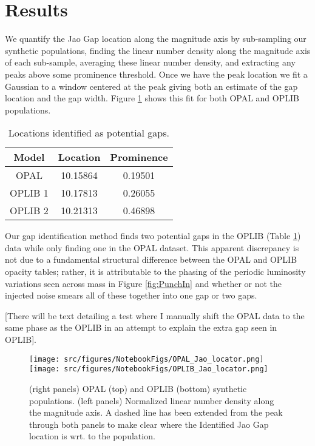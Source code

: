 \section{Results}\label{sec:results}
We quantify the Jao Gap location along the magnitude axis by sub-sampling
our synthetic populations, finding the linear number density along the
magnitude axis of each sub-sample, averaging these linear number density, and
extracting any peaks above some prominence threshold. Once we have the peak
location we fit a Gaussian to a window centered at the peak giving both an
estimate of the gap location and the gap width. Figure \ref{fig:JaoGapLocator}
shows this fit for both OPAL and OPLIB populations.

\begin{table}
	\centering
	\begin{tabular}{c | c c}
		\hline
		Model & Location & Prominence \\
		\hline
		\hline
		OPAL & 10.15864 & 0.19501 \\
		OPLIB 1 & 10.17813 & 0.26055 \\
		OPLIB 2 & 10.21313 & 0.46898
	\end{tabular}
	\caption{Locations identified as potential gaps.}
	\label{tab:GapLocation}
\end{table}

Our gap identification method finds two potential gaps in the OPLIB (Table
\ref{tab:GapLocation}) data while only finding one in the OPAL dataset. This
apparent discrepancy is not due to a fundamental structural difference between
the OPAL and OPLIB opacity tables; rather, it is attributable to the
phasing of the periodic luminosity variations seen across mass in Figure
\ref{fig:PunchIn} and whether or not the
injected noise smears all of these together into one gap or two gaps.

{\color{red} [There will be text detailing a test where I manually shift the
OPAL data to the same phase as the OPLIB in an attempt to explain the extra gap
seen in OPLIB]}.

\begin{figure}
	\centering
	\texttt{[image: src/figures/NotebookFigs/OPAL\_Jao\_locator.png]}
	\texttt{[image: src/figures/NotebookFigs/OPLIB\_Jao\_locator.png]}
	\caption{(right panels) OPAL (top) and OPLIB (bottom) synthetic
	populations. (left panels) Normalized linear number density along the
	magnitude axis. A dashed line has been extended from the peak through both
	panels to make clear where the Identified Jao Gap location is wrt. to the
	population. }
	\label{fig:JaoGapLocator}
\end{figure}

